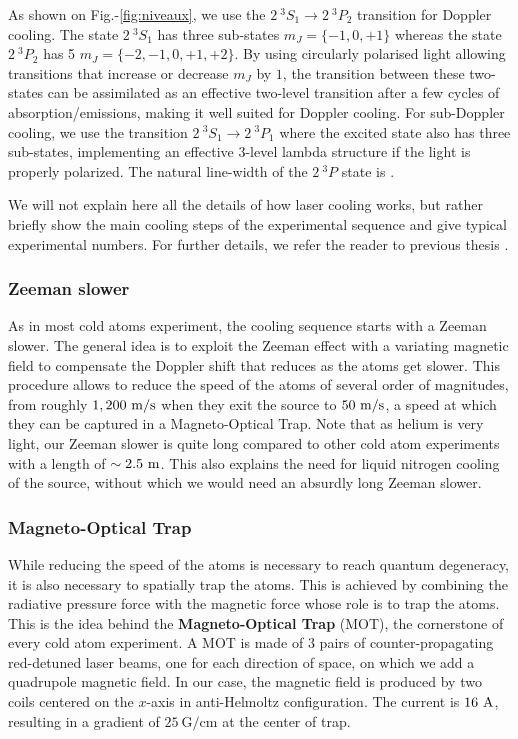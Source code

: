 As shown on Fig.-\ref{fig:niveaux}, we use the $2 \ ^3 S_1 \rightarrow 2 \ ^3 P_2$ transition for Doppler cooling. The state $2 \ ^3 S_1$ has three sub-states $m_J=\{-1,0,+1\}$ whereas the state $2 \ ^3 P_2$ has 5 $m_J=\{-2,-1,0,+1,+2\}$. By using circularly polarised light allowing transitions that increase or decrease $m_J$ by $1$, the transition between these two-states can be assimilated as an effective two-level transition after a few cycles of absorption/emissions, making it well suited for Doppler cooling. For sub-Doppler cooling, we use the transition  $2 \ ^3 S_1 \rightarrow 2 \ ^3 P_1$ where the excited state also has three sub-states, implementing an effective 3-level lambda structure if the light is properly polarized. The natural line-width of the $2 \ ^3 P$ state is .

We will not explain here all the details of how laser cooling works, but rather briefly show the main cooling steps of the experimental sequence and give typical experimental numbers. For further details, we refer the reader to previous thesis \cite{hoend2014,bouton_these,cayla_these}.



\subsubsection{Zeeman slower}

As in most cold atoms experiment, the cooling sequence starts with a Zeeman slower. The general idea is to exploit the Zeeman effect with a variating magnetic field to compensate the Doppler shift that reduces as the atoms get slower. This procedure allows to reduce the speed of the atoms of several order of magnitudes, from roughly $1,200 \ \rm{m/s}$ when they exit the source to $50 \ \rm{m/s}$, a speed at which they can be captured in a Magneto-Optical Trap. Note that as helium is very light, our Zeeman slower is quite long compared to other cold atom experiments with a length of $\sim 2.5 \ \rm{m}$. This also explains the need for liquid nitrogen cooling of the source, without which we would need an absurdly long Zeeman slower.

\subsubsection{Magneto-Optical Trap}

While reducing the speed of the atoms is necessary to reach quantum degeneracy, it is also necessary to spatially trap the atoms. This is achieved by combining the radiative pressure force with the magnetic force whose role is to trap the atoms. This is the idea behind the \textbf{Magneto-Optical Trap} (MOT), the cornerstone of every cold atom experiment. A MOT is made of 3 pairs of counter-propagating red-detuned laser beams, one for each direction of space, on which we add a quadrupole magnetic field. In our case, the magnetic field is produced by two coils centered on the $x$-axis in anti-Helmoltz configuration. The current is $16 \ \rm{A}$, resulting in a gradient of $25 \ \mathrm{G/cm}$ at the center of trap.

